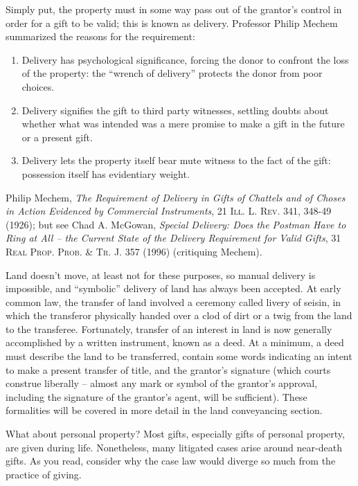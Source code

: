 Simply put, the property must in some way pass out of the grantor's control in
order for a gift to be valid; this is known as delivery.  Professor Philip
Mechem summarized the reasons for the requirement: 
\begin{enumerate}
\item Delivery has psychological significance, forcing the donor to confront the
loss of the property: the ``wrench of delivery'' protects the donor from poor
choices. 
\item Delivery signifies the gift to third party witnesses, settling doubts
about whether what was intended was a mere promise to make a gift in the future
or a present gift.  
\item Delivery lets the property itself bear mute witness to the fact of the
gift: possession itself has evidentiary weight.  
\end{enumerate}
Philip Mechem, \textit{The Requirement of Delivery in Gifts of Chattels and of
Choses in Action Evidenced by Commercial Instruments}, 21 \textsc{Ill. L. Rev.}
341, 348-49 (1926); but see Chad A. McGowan, \textit{Special Delivery: Does the
Postman Have to Ring at All -- the Current State of the Delivery Requirement
for Valid Gifts}, \textsc{31 Real Prop. Prob. \& Tr. J.} 357 (1996) (critiquing
Mechem).

Land doesn't move, at least not for these purposes, so manual delivery is
impossible, and ``symbolic'' delivery of land has always been accepted.  At
early common law, the transfer of land involved a ceremony called livery of
seisin, in which the transferor physically handed over a clod of dirt or a twig
from the land to the transferee.  Fortunately, transfer of an interest in land
is now generally accomplished by a written instrument, known as a deed.  At a
minimum, a deed must describe the land to be transferred, contain some words
indicating an intent to make a present transfer of title, and the grantor's
signature (which courts construe liberally -- almost any mark or symbol of the
grantor's approval, including the signature of the grantor's agent, will be
sufficient). These formalities will be covered in more detail in the land
conveyancing section.

What about personal property?  Most gifts, especially gifts of personal
property, are given during life.  Nonetheless, many litigated cases arise
around near-death gifts.  As you read, consider why the case law would diverge
so much from the practice of giving.

